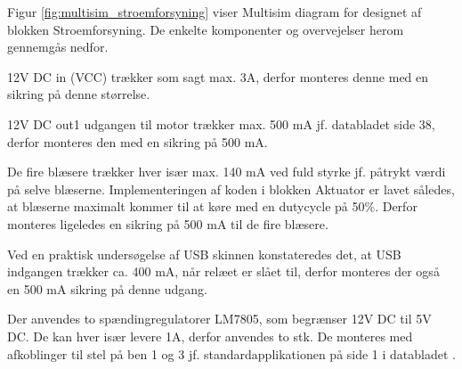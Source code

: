 Figur \ref{fig:multisim_stroemforsyning} viser Multisim diagram for designet af blokken Stroemforsyning. 
De enkelte komponenter og overvejelser herom gennemgås nedfor. 

\clearpage

12V DC in (VCC) trækker som sagt max. 3A, derfor monteres denne med en sikring på denne størrelse. 

12V DC out1 udgangen til motor trækker max. 500 mA jf. databladet \cite{lib:UHD2_DS} side 38, derfor monteres den med en sikring på 500 mA. 

De fire blæsere trækker hver især max. 140 mA ved fuld styrke jf. påtrykt værdi på selve blæserne. 
Implementeringen af koden i blokken Aktuator er lavet således, at blæserne maximalt kommer til at køre med en dutycycle på 50\%. 
Derfor monteres ligeledes en sikring på 500 mA til de fire blæsere. 

Ved en praktisk undersøgelse af USB skinnen konstateredes det, at USB indgangen trækker ca. 400 mA, når relæet er slået til, derfor monteres der også en 500 mA sikring på denne udgang. 

Der anvendes to spændingregulatorer LM7805, som begrænser 12V DC til 5V DC. 
De kan hver især levere 1A, derfor anvendes to stk. 
De monteres med afkoblinger til stel på ben 1 og 3 jf. standardapplikationen på side 1 i databladet \cite{lib:LM7805_DS}.

\clearpage

